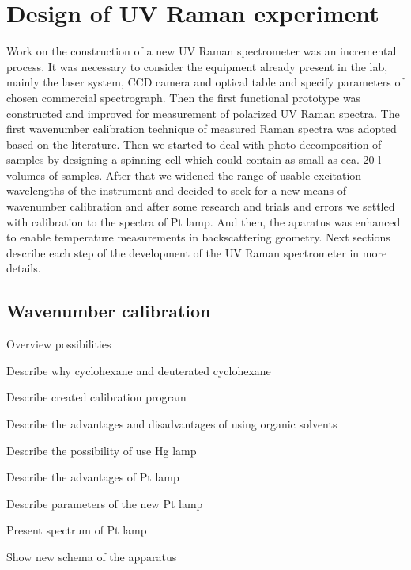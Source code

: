 \section{Design of UV Raman experiment}

Work on the construction of a new UV Raman spectrometer was an incremental
process. It was necessary to consider the equipment already present in the lab,
mainly the laser system, CCD camera and optical table and specify parameters of
chosen commercial spectrograph. Then the first functional prototype was
constructed and improved for measurement of polarized UV Raman spectra. The
first wavenumber calibration technique of measured Raman spectra
was adopted based on the literature. Then we started to deal with
photo-decomposition of samples by designing a spinning cell which could contain
as small as cca. 20 l volumes of samples. After that we widened the range
of usable excitation wavelengths of the instrument and decided to seek for a
new means of wavenumber calibration and after some research and trials and
errors we settled with calibration to the spectra of Pt lamp. And then, the
aparatus was enhanced to enable temperature measurements in backscattering
geometry. Next sections describe each step of the development of the UV Raman
spectrometer in more details.










\subsection{Wavenumber calibration}
\begin{docitemize}
	\item Overview possibilities
	\item Describe why cyclohexane and deuterated cyclohexane
	\item Describe created calibration program
	\item Describe the advantages and disadvantages of using organic solvents
	\item Describe the possibility of use Hg lamp
	\item Describe the advantages of Pt lamp
	\item Describe parameters of the new Pt lamp
	\item Present spectrum of Pt lamp
	\item Show new schema of the apparatus
\end{docitemize}


